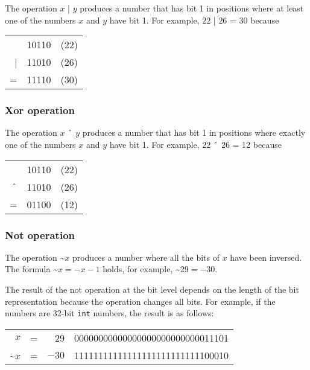 
The  operation $x$ | $y$ produces a number
that has bit 1 in positions where at least one
of the numbers
$x$ and $y$ have bit 1.
For example, $22$ | $26$ = 30 because

\begin{center}
\begin{tabular}{rrr}
& 10110 & (22)\\
| & 11010 & (26) \\
\hline
 = & 11110 & (30) \\
\end{tabular}
\end{center}

\subsubsection{Xor operation}


The  operation $x$ $\XOR$ $y$ produces a number
that has bit 1 in positions where exactly one
of the numbers
$x$ and $y$ have bit 1.
For example, $22$ $\XOR$ $26$ = 12 because

\begin{center}
\begin{tabular}{rrr}
& 10110 & (22)\\
$\XOR$ & 11010 & (26) \\
\hline
 = & 01100 & (12) \\
\end{tabular}
\end{center}

\subsubsection{Not operation}


The  operation \textasciitilde$x$
produces a number where all the bits of $x$
have been inversed.
The formula \textasciitilde$x = -x-1$ holds,
for example, \textasciitilde$29 = -30$.

The result of the not operation at the bit level
depends on the length of the bit representation
because the operation changes all bits.
For example, if the numbers are 32-bit
\texttt{int} numbers, the result is as follows:

\begin{center}
\begin{tabular}{rrrr}
$x$ & = & 29 &   00000000000000000000000000011101 \\
\textasciitilde$x$ & = & $-30$ & 11111111111111111111111111100010 \\
\end{tabular}
\end{center}

